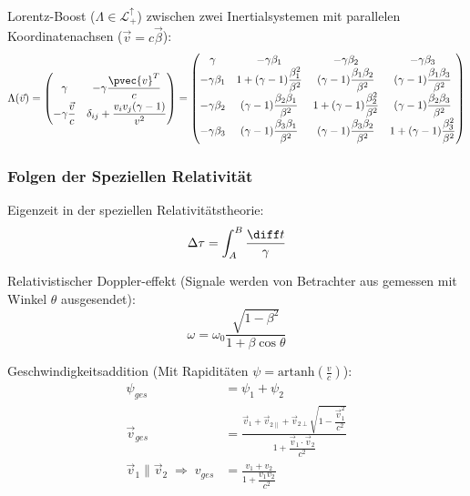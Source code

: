 \documentclass[11pt]{article}
\numberwithin{equation}{section}
\begin{document}
          Lorentz-Boost ($\Lambda\in\mathcal{L}^\uparrow_+$) zwischen zwei Inertialsystemen mit parallelen Koordinatenachsen ($\vec{v}=c\vec{\beta}$):
          \begin{equation}
            \Lambda(\vec{v}) = \left( \begin{matrix}
              \gamma & -\gamma\dfrac{\pvec{v}^T}{c} \\[6pt]
              -\gamma\dfrac{\vec{v}}{c} & \delta_{ij}+\dfrac{v_i v_j(\gamma-1)}{v^2}
              \end{matrix} \right)
              =
              \left(\begin{matrix}
                \gamma & -\gamma \beta_1 & -\gamma \beta_2 & -\gamma \beta_3 \\
                -\gamma \beta_1 & 1+(\gamma -1){\dfrac {\beta_1^{2}}{\beta^{2}}} & (\gamma -1){\dfrac {\beta_1 \beta_2}{\beta^{2}}}&(\gamma -1){\dfrac {\beta_1\beta_3}{\beta^{2}}} \\
                -\gamma \beta_2 & (\gamma -1){\dfrac {\beta_2\beta_1}{\beta^{2}}} & 1+(\gamma -1){\dfrac {\beta_2^{2}}{\beta^{2}}}&(\gamma -1){\dfrac {\beta_2 \beta_3}{\beta^{2}}} \\
                -\gamma \beta_3 &(\gamma -1){\dfrac {\beta_3\beta_1}{\beta^{2}}}&(\gamma -1){\dfrac {\beta_3\beta_2}{\beta^{2}}}&1+(\gamma -1){\dfrac {\beta_3^{2}}{\beta^{2}}}
              \end{matrix}\right)
          \end{equation}

        \subsubsection{Folgen der Speziellen Relativität}
          Eigenzeit in der speziellen Relativitätstheorie:
          \begin{equation}
            \Delta\tau = \int_A^B \frac{\diff t}{\gamma}
          \end{equation}

          Relativistischer Doppler-effekt (Signale werden von Betrachter aus gemessen mit Winkel $\theta$ ausgesendet):
          \begin{equation}
            \omega = \omega_0\frac{\sqrt{1-\beta^2}}{1+\beta\cos\theta}
          \end{equation}

          Geschwindigkeitsaddition (Mit Rapiditäten $\psi = \mathrm{artanh}\left(\frac{v}{c}\right)$):
          \begin{equation}
            \begin{aligned}
              \psi_{ges} &= \psi_1+\psi_2 \\
              \vec{v}_{ges} &= \frac{\vec{v}_1+\vec{v}_{2\parallel}+\vec{v}_{2\perp}\sqrt{1-\dfrac{\vec{v}_1^2}{c^2}}}{1+\dfrac{\vec{v}_1\cdot\vec{v}_2}{c^2}} \\
              \vec{v}_1\parallel\vec{v}_2 \;\Rightarrow\; v_{ges} &= \frac{v_1+v_2}{1+\dfrac{v_1 v_2}{c^2}}
            \end{aligned}
          \end{equation}
\end{document}
